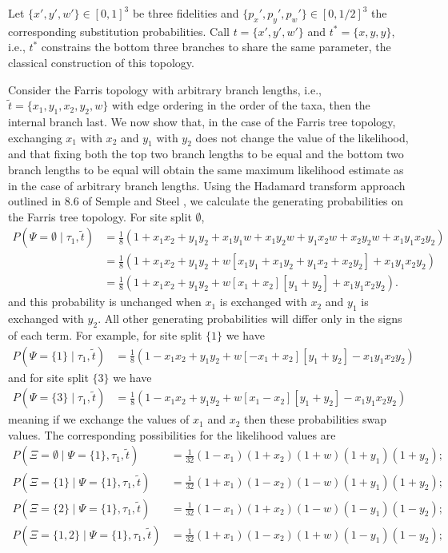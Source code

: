 \documentclass{article}
\newcommand{\siteSplitRV}{\Psi}
\newcommand{\ancestralSplitRV}{\Xi}
\begin{document}
Let $\{x',y',w'\}\in[0,1]^3$ be three fidelities and $\{p_x',p_y',p_w'\}\in[0,1/2]^3$ the corresponding substitution probabilities.
Call $t=\{x',y',w'\}$ and $t^*=\{x,y,y\}$, i.e., $t^*$ constrains the bottom three branches to share the same parameter, the classical construction of this topology.

Consider the Farris topology with arbitrary branch lengths, i.e., $\tilde{t}=\{x_1,y_1,x_2,y_2,w\}$ with edge ordering in the order of the taxa, then the internal branch last.
We now show that, in the case of the Farris tree topology, exchanging $x_1$ with $x_2$ and $y_1$ with $y_2$ does not change the value of the likelihood, and that fixing both the top two branch lengths to be equal and the bottom two branch lengths to be equal will obtain the same maximum likelihood estimate as in the case of arbitrary branch lengths.
Using the Hadamard transform approach outlined in 8.6 of Semple and Steel \cite{Semple2003-em}, we calculate the generating probabilities on the Farris tree topology.
For site split $\emptyset$,
\begin{align*}
    P(\siteSplitRV=\emptyset\mid \tau_1, \tilde{t}) & = \frac{1}{8} (1 + x_1x_2 +  y_1y_2 +  x_1y_1w + x_1y_2w + y_1x_2w + x_2y_2w + x_1y_1x_2y_2) \\
                                              & = \frac{1}{8} (1 + x_1x_2 +  y_1y_2 +  w[x_1y_1 + x_1y_2 + y_1x_2 + x_2y_2] + x_1y_1x_2y_2) \\
                                              & = \frac{1}{8} (1 + x_1x_2 +  y_1y_2 +  w[x_1 + x_2][y_1 + y_2] + x_1y_1x_2y_2).
\end{align*}
and this probability is unchanged when $x_1$ is exchanged with $x_2$ and $y_1$ is exchanged with $y_2$.
All other generating probabilities will differ only in the signs of each term.
For example, for site split $\{1\}$ we have
\begin{align*}
    P(\siteSplitRV=\{1\}\mid \tau_1, \tilde{t}) & = \frac{1}{8} (1 - x_1x_2 +  y_1y_2 +  w[-x_1 + x_2][y_1 + y_2] - x_1y_1x_2y_2)
\end{align*}
and for site split $\{3\}$ we have
\begin{align*}
    P(\siteSplitRV=\{3\}\mid \tau_1, \tilde{t}) & = \frac{1}{8} (1 - x_1x_2 +  y_1y_2 +  w[x_1 - x_2][y_1 + y_2] - x_1y_1x_2y_2)
\end{align*}
meaning if we exchange the values of $x_1$ and $x_2$ then these probabilities swap values.
The corresponding possibilities for the likelihood values are
\begin{align*}
    P(\ancestralSplitRV=\emptyset \mid \siteSplitRV=\{1\}, \tau_1, \tilde{t}) &= \frac{1}{32}(1-x_1)(1+x_2)(1+w)(1+y_1)(1+y_2); \\
    P(\ancestralSplitRV=\{1\} \mid \siteSplitRV=\{1\}, \tau_1, \tilde{t}) &= \frac{1}{32}(1+x_1)(1-x_2)(1-w)(1+y_1)(1+y_2); \\
    P(\ancestralSplitRV=\{2\} \mid \siteSplitRV=\{1\}, \tau_1, \tilde{t}) &= \frac{1}{32}(1-x_1)(1+x_2)(1-w)(1-y_1)(1-y_2); \\
    P(\ancestralSplitRV=\{1,2\} \mid \siteSplitRV=\{1\}, \tau_1, \tilde{t}) &= \frac{1}{32}(1+x_1)(1-x_2)(1+w)(1-y_1)(1-y_2);
\end{align*}
\end{document}
